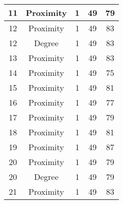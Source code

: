 \documentclass[results.tex]{subfiles}
\begin{document}
\begin{center}
\begin{tabular}{| c || c | c | c | c |}
            \hline
            11                      & Proximity                    & 1                      & 49                      & 79                   \\
            \hline
            12                      & Proximity                    & 1                      & 49                      & 83                   \\
            \hline
            12                      & Degree                       & 1                      & 49                      & 83                   \\
            \hline
            13                      & Proximity                    & 1                      & 49                      & 83                   \\
            \hline
            14                      & Proximity                    & 1                      & 49                      & 75                   \\
            \hline
            15                      & Proximity                    & 1                      & 49                      & 81                   \\
            \hline
            16                      & Proximity                    & 1                      & 49                      & 77                   \\
            \hline
            17                      & Proximity                    & 1                      & 49                      & 79                   \\
            \hline
            18                      & Proximity                    & 1                      & 49                      & 81                   \\
            \hline
            19                      & Proximity                    & 1                      & 49                      & 87                   \\
            \hline
            20                      & Proximity                    & 1                      & 49                      & 79                   \\
            \hline
            20                      & Degree                       & 1                      & 49                      & 79                   \\
            \hline
            21                      & Proximity                    & 1                      & 49                      & 83                   \\

\end{tabular}
\end{center}
\end{document}
